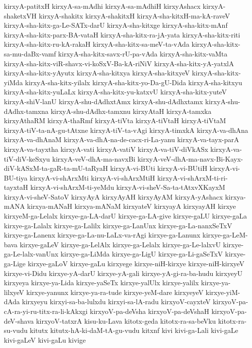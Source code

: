 {kirxyA-patitxH
kirxyA-sa-mAdhi
kirxyA-sa-mAdhiH
kirxyAshacx
kirxyA-shaketxVH
kirxyA-shakitx
kirxyA-shakitxH
kirxyA-sha-kitxH-ma-kA-raveV
kirxyA-sha-kitx-ga-Le-SATx-darU
kirxyA-sha-kitxge
kirxyA-sha-kitx-mAnf
kirxyA-sha-kitx-parx-BA-vataH
kirxyA-sha-kitx-ra-jA-yata
kirxyA-sha-kitx-riti
kirxyA-sha-kitx-ru-kA-rakaH
kirxyA-sha-kitx-sa-meV-ta-vAda
kirxyA-sha-kitx-sa-mu-daBx-vamf
kirxyA-sha-kitx-savx-rU-pa-vAda
kirxyA-sha-kitx-vaMta
kirxyA-sha-kitx-viR-shavx-vi-koSxV-Ba-kA-riNiV
kirxyA-sha-kitx-yA-yatxlA
kirxyA-sha-kitx-yAyutx
kirxyA-sha-kitxya
kirxyA-sha-kitxyeV
kirxyA-sha-kitx-yiMda
kirxyA-sha-kitx-yilalx
kirxyA-sha-kitx-yo-Da-gU-Dida
kirxyA-sha-kitxyu
kirxyA-sha-kitx-yuLaLx
kirxyA-sha-kitx-yu-katxvU
kirxyA-sha-kitx-yuteV
kirxyA-shiV-lanU
kirxyA-shu-dAdhxtAmx
kirxyA-shu-dAdhxtamx
kirxyA-shu-dAdhx-tamxna
kirxyA-shu-dAdhx-tamxnu
kirxyAtaH
kirxyA-tamxka
kirxyAthaRM
kirxyA-thaRmf
kirxyA-tiVta
kirxyA-tiVtaH
kirxyA-tiVtaM
kirxyA-tiV-ta-nA-gu-tAtxne
kirxyA-tiV-ta-vAgi
kirxyA-timxkA
kirxyA-va-dhAna
kirxyA-va-dhAnaM
kirxyA-va-dhA-na-de-cacx-ri-La-yanu
kirxyA-va-tayx-parA
kirxyA-va-tayxtha
kirxyA-vati
kirxyA-vatiV
kirxyA-va-tiV-diVkASx
kirxyA-va-tiV-diV-keSxyu
kirxyA-veV-dhA-ma-navxBi
kirxyA-veV-dhA-ma-navx-Bi-Kayx-diV-kASxM-ta-gaR-ta-mU-taRyaH
kirxyA-vi-BUti
kirxyA-vi-BUtiH
kirxyA-vi-BU-tiya
kirxyA-vi-shArxMti
kirxyA-vi-shArxMtiH
kirxyA-vi-shArxM-ti-ri-tayxtaH
kirxyA-vi-shArxM-ti-yeMdu
kirxyA-vi-sheV-Sa-ta-tAtxvXKayxM
kirxyA-vi-sheV-SatoV
kirxyAyA
kirxyAyAH
kirxyAyAM
kirxyA-yAshacx
kirxya-mANA
kirxya-mANaH
kirxya-mANaM
kirxyateV
kirxyayA
kirxyayAH
kirxye
kirxyeM-ga-Lelalx
kirxye-ga-LA-darU
kirxye-ga-LA-give
kirxye-gaLU
kirxye-gaLa
kirxye-ga-Lalalx
kirxye-ga-Lalilx
kirxye-ga-LanUnx
kirxye-ga-La-nanxSeTxV
kirxye-ga-Lanenx
kirxye-ga-La-nu-LaLx-va-rAgi
kirxye-ga-Lanunx
kirxye-ga-LeM-bava
kirxye-gaLeV
kirxye-ga-LelAlx
kirxye-ga-Lelalx
kirxye-ga-Le-lalxvU
kirxye-ga-Le-lalx-vanUnx
kirxye-ga-LiMda
kirxye-ga-LigU
kirxye-ga-Li-gaSeTxV
kirxye-ga-Lige
kirxye-gaLoV
kirxye-gaLu
kirxyege
kirxye-niH-kirxye
kirxye-niH-kirxyeV
kirxye-vi-Didu
kirxye-yA-darU
kirxye-yA-gali
kirxye-yA-gi-ra-ba-hudu
kirxyeyU
kirxyeya
kirxye-ya-Lida
kirxye-yaSeTx
kirxye-yalUlx
kirxye-yalilx
kirxye-ya-lilxyeV
kirxye-yanunx
kirxye-ya-ra-tude
kirxye-yeM-dare
kirxyeyeV
kirxye-yiM-dAda
kirxyeyu
kirxyi-sa-ba-lulxdu
kirxyi-sa-lA-radu
kirxyoV-cayxteV
kirxyoV-pa-cA-ra-yi-ru-titx-ra-li-kAkxgi
kirxyoV-pa-deVsha
kirxyoV-pa-deVshaH
kirxyoV-pa-deV-shava
kirxyoV-tatxrA
kisu-ku-Lava
kitotx-geda
kitotx-ra-sa-beVku
kitotx-ra-su-vudu
kitutx
kitutx-hA-ki-daM-tA-gu-vudu
kitxnf
kivi
kivi-ga-Lali
kivi-gaLe
kivi-gaLeV
kivi-gaLu
kivige
}
